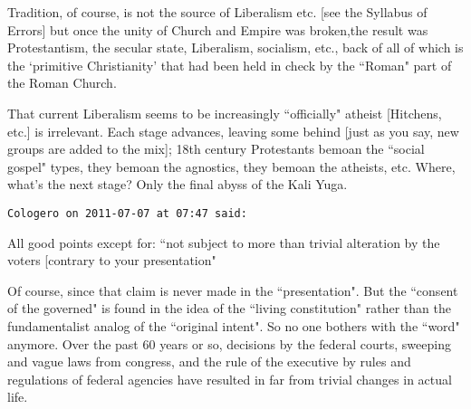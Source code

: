 \begin{footnotesize}
\begin{sffamily}
Tradition, of course, is not the source of Liberalism etc. [see the Syllabus of Errors] but once the unity of Church and Empire was broken,the result was Protestantism, the secular state, Liberalism, socialism, etc., back of all of which is the `primitive Christianity' that had been held in check by the ``Roman" part of the Roman Church.

That current Liberalism seems to be increasingly ``officially" atheist [Hitchens, etc.] is irrelevant. Each stage advances, leaving some behind [just as you say, new groups are added to the mix]; 18th century Protestants bemoan the ``social gospel" types, they bemoan the agnostics, they bemoan the atheists, etc. Where, what's the next stage? Only the final abyss of the Kali Yuga.


\hfill

\texttt{Cologero on 2011-07-07 at 07:47 said: }

All good points except for: ``not subject to more than trivial alteration by the voters [contrary to your presentation"

Of course, since that claim is never made in the ``presentation". But the ``consent of the governed" is found in the idea of the ``living constitution" rather than the fundamentalist analog of the ``original intent". So no one bothers with the ``word" anymore. Over the past 60 years or so, decisions by the federal courts, sweeping and vague laws from congress, and the rule of the executive by rules and regulations of federal agencies have resulted in far from trivial changes in actual life.


\hfill


\end{sffamily}\end{footnotesize}
